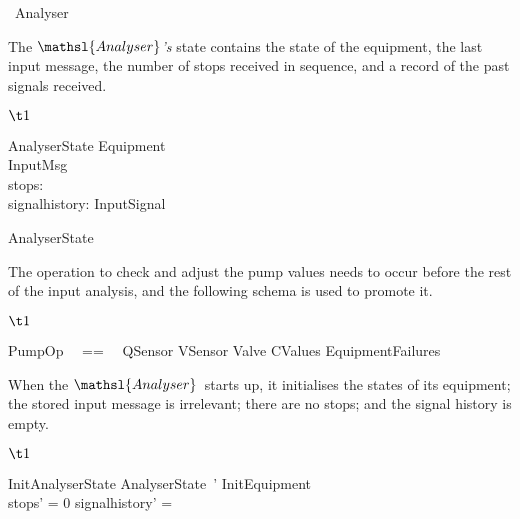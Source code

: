 \documentclass{report}
\begin{document}
\begin{circus}
   \circprocess\ Analyser \circdef\ \circbegin
\end{circus}
The \( \mathsl{Analyser} \)\textsl{'s}\/ state contains the state of
the equipment, the last input message, the number of stops received in
sequence, and a record of the past signals received.
\begin{flushleft}
  $\t1$
  \begin{minipage}{.923\textwidth}
    \begin{schema}{AnalyserState}
      Equipment
      \\ %
      InputMsg
      \\ %
      stops: \nat
      \\ %
      signalhistory: \power InputSignal
    \end{schema}
    \begin{circusaction}
       \circstate AnalyserState
    \end{circusaction}
  \end{minipage}
\end{flushleft}
The operation to check and adjust the pump values needs to occur
before the rest of the input analysis, and the following schema is
used to promote it.
\begin{flushleft}
  $\t1$
  \begin{minipage}{.923\textwidth}
    \begin{zed}
      PumpOp ~~==~~ \Xi QSensor \land \Xi VSensor \land \Xi Valve \land
                    \Xi CValues \land \Xi EquipmentFailures
    \end{zed}
  \end{minipage}
\end{flushleft}
When the \( \mathsl{Analyser} \, \)\/ starts up, it initialises the
states of its equipment; the stored input message is irrelevant; there
are no stops; and the signal history is empty.
\begin{flushleft}
  $\t1$
  \begin{minipage}{.923\textwidth}
    \begin{schema}{InitAnalyserState}
      AnalyserState~'
      \where %
      InitEquipment
      \\ %
      stops' = 0 \land signalhistory' = \emptyset
    \end{schema}
  \end{minipage}
\end{flushleft}
\end{document}
